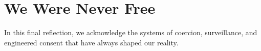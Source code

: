\chapter*{We Were Never Free}
In this final reflection, we acknowledge the systems of coercion, surveillance,
 and engineered consent that have always shaped our reality.

